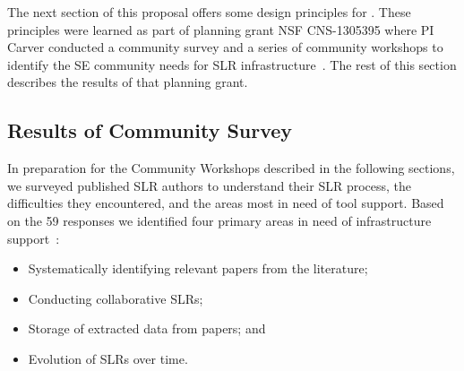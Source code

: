 The next section of this proposal
offers some design principles for {\IT}.
These principles were learned
as part of planning grant NSF CNS-1305395 where PI Carver conducted a community survey and a series of community workshops to identify the SE community needs for SLR infrastructure~\cite{hassler2014outcomes, carver2013identifying, hassler2016identification}.
The rest of this section describes the results of that planning grant.
\vspace{8pt}

\subsection{Results of Community Survey}
In preparation for the Community Workshops described in the following sections, we surveyed published SLR authors to understand their SLR process, the difficulties they encountered, and the areas most in need of tool support.
Based on the 59 responses we identified four primary areas in need of infrastructure support~\cite{Carver-etal:13}:
\vspace{-8pt}
\begin{itemize}
	\item Systematically identifying relevant papers from the literature;
	\vspace{-4pt}
	\item Conducting collaborative SLRs;
	\vspace{-4pt}
	\item Storage of extracted data from papers; and
	\vspace{-4pt}
	\item Evolution of SLRs over time.
\end{itemize}

